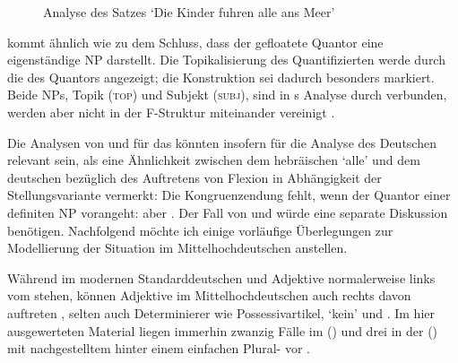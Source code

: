 \begin{figure}
	\caption{Analyse des Satzes  `Die Kinder
		fuhren alle ans Meer'}
	\label{fig:hebrqf}
\end{figure}

\citet[533--534]{spector2009} kommt ähnlich wie \citet[29]{pittner1995} zu dem
Schluss, dass der gefloatete Quantor eine eigenständige NP
darstellt. Die Topikalisierung des Quantifizierten werde durch die
 des Quantors angezeigt; die Konstruktion sei dadurch
besonders markiert. Beide NPs, Topik (\textsc{top}) und
Subjekt (\textsc{subj}), sind in \citeauthor{spector2009}s Analyse durch
 verbunden, werden aber nicht in der
F-Struktur miteinander vereinigt
\autocite[vgl.][99]{bresnanetal2016}.

Die Analysen von \citet{shlonsky1991} und \citet{spector2009} für das
 könnten insofern für die Analyse des Deutschen
relevant sein, als \citet[179]{merchant1996} eine Ähnlichkeit zwischen dem
hebräischen  `alle' und dem deutschen
 bezüglich des Auftretens von Flexion in Abhängigkeit der
Stellungsvariante vermerkt: Die Kongruenzendung fehlt, wenn der
Quantor einer definiten NP vorangeht:  aber . Der Fall von  und  würde
eine separate Diskussion benötigen. Nachfolgend möchte ich einige
vorläufige Überlegungen zur Modellierung der Situation im
Mittelhochdeutschen anstellen.

Während im modernen Standarddeutschen  und
Adjektive normalerweise links vom 
stehen, können Adjektive im Mittelhochdeutschen auch
rechts davon auftreten \autocite[185--186, 237--243]{ksw2}, selten auch
Determinierer wie Possessivartikel,  `kein' und
 \autocite[515--517, 551--552, 623--624]{ksw2}. Im hier
ausgewerteten Material liegen immerhin zwanzig Fälle im  (\CAO) und drei in der  (\KC)
mit nachgestelltem  hinter einem einfachen Plural-
vor .

